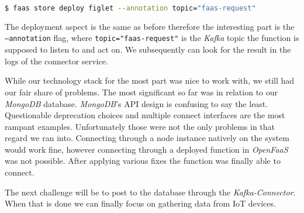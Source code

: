 \begin{lstlisting}[language=bash]
$ faas store deploy figlet --annotation topic="faas-request"
\end{lstlisting}

The deployment aspect is the same as before therefore the interesting part is the
\texttt{--annotation} flag, where \texttt{topic="faas-request"} is the \textit{Kafka} topic the
function is supposed to listen to and act on. We subsequently can look for the result in the logs of
the connector service.

While our technology stack for the most part was nice to work with, we still had our fair share of
problems. The most significant so far was in relation to our \textit{MongoDB} database.
\textit{MongoDB}'s API design is confusing to say the least. Questionable deprecation choices and
multiple connect interfaces are the most rampant examples. Unfortunately those were not the only
problems in that regard we ran into. Connecting through a node instance natively on the system would
work fine, however connecting through a deployed function in \textit{OpenFaaS} was not possible.
After applying various fixes the function was finally able to connect.

The next challenge will be to post to the database through the \textit{Kafka-Connector}. When that
is done we can finally focus on gathering data from IoT devices.





